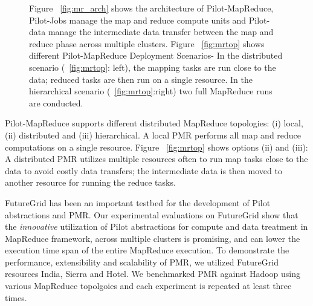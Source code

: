 \documentclass[]{paper}
\begin{document}
\begin{figure}[t]
	\caption{ Figure ~\ref{fig:mr_arch} shows the architecture of Pilot-MapReduce, Pilot-Jobs manage the map and reduce compute  units and Pilot-data manage the intermediate data transfer between the map and reduce phase across multiple clusters. Figure ~\ref{fig:mrtop} shows different Pilot-MapReduce Deployment Scenarios- In the distributed scenario (~\ref{fig:mrtop}: left), the mapping tasks are run close to the data; reduced tasks are then run on a single resource. In the hierarchical scenario (~\ref{fig:mrtop}:right) two full MapReduce runs are conducted.  }
	\label{fig:combo_2}

\end{figure}

Pilot-MapReduce supports different distributed MapReduce topologies: (i) local, (ii) distributed and (iii) hierarchical. A local PMR performs all map and reduce computations on a single resource. Figure ~\ref{fig:mrtop} shows options (ii) and (iii): A distributed PMR utilizes multiple resources often to run map tasks close to the data to avoid costly data transfers; the intermediate data is then moved to another resource for running the reduce tasks. ~\cite{pmr-2012}


FutureGrid has been an important testbed for the development of Pilot abstractions and PMR.
Our experimental evaluations on FutureGrid show that the \textit{innovative} utilization of Pilot abstractions for compute and data treatment in MapReduce framework, across multiple clusters is promising, and can lower the execution time span of the entire MapReduce execution. To demonstrate the performance, extensibility and scalability of PMR, we utilized FutureGrid resources India, Sierra and Hotel.  We benchmarked PMR against Hadoop using various MapReduce topolgoies and each experiment is repeated at least three times.
\end{document}

